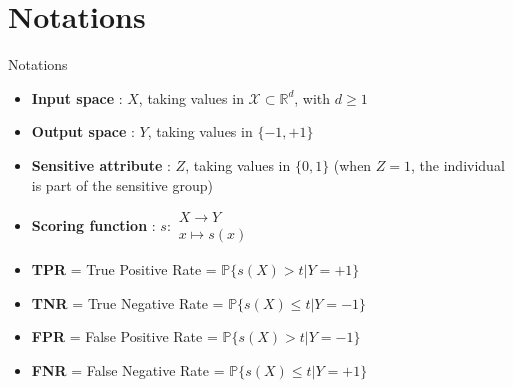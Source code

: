 
\section{Notations}
\begin{frame}{Notations}

    \begin{itemize}
        \item \textbf{Input space} : $X$, taking values in $\mathcal{X} \subset \mathbb{R}^d$, with $d \geq 1$
        \item \textbf{Output space} : $Y$, taking values in $\{-1,+1\}$ 
        \item \textbf{Sensitive attribute} : $Z$, taking values in $\{0,1\}$ (when $Z=1$, the individual is part of the sensitive group)
        \item \textbf{Scoring function} : $s : \substack{X \rightarrow Y \\ x \mapsto s(x)}$ 
        \item \textbf{TPR} = True Positive Rate = $\mathbb{P} \{s(X) > t | Y = +1 \}$
        \item \textbf{TNR} = True Negative Rate = $\mathbb{P} \{s(X) \leq t | Y = -1 \}$
        \item \textbf{FPR} =  False Positive Rate = $\mathbb{P} \{s(X) > t | Y = -1 \}$
        \item \textbf{FNR} = False Negative Rate = $\mathbb{P} \{s(X) \leq t | Y = +1 \}$
    \end{itemize}
    
\end{frame}

